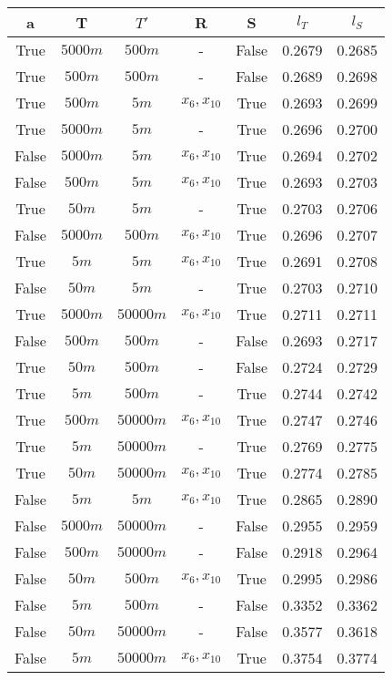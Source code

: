 \begin{tabular}{| c c c | c c | c c |}
\hline
a & T & $T'$ & R & S & $l_T$ & $l_S$ \\
\hline
True & $5000m$ & $500m$ & - & False & 0.2679 & 0.2685 \\
True & $500m$ & $500m$ & - & False & 0.2689 & 0.2698 \\
True & $500m$ & $5m$ & $x_{6}, x_{10}$ & True & 0.2693 & 0.2699 \\
True & $5000m$ & $5m$ & - & True & 0.2696 & 0.2700 \\
False & $5000m$ & $5m$ & $x_{6}, x_{10}$ & True & 0.2694 & 0.2702 \\
False & $500m$ & $5m$ & $x_{6}, x_{10}$ & True & 0.2693 & 0.2703 \\
True & $50m$ & $5m$ & - & True & 0.2703 & 0.2706 \\
False & $5000m$ & $500m$ & $x_{6}, x_{10}$ & True & 0.2696 & 0.2707 \\
True & $5m$ & $5m$ & $x_{6}, x_{10}$ & True & 0.2691 & 0.2708 \\
False & $50m$ & $5m$ & - & True & 0.2703 & 0.2710 \\
True & $5000m$ & $50000m$ & $x_{6}, x_{10}$ & True & 0.2711 & 0.2711 \\
False & $500m$ & $500m$ & - & False & 0.2693 & 0.2717 \\
True & $50m$ & $500m$ & - & False & 0.2724 & 0.2729 \\
True & $5m$ & $500m$ & - & True & 0.2744 & 0.2742 \\
True & $500m$ & $50000m$ & $x_{6}, x_{10}$ & True & 0.2747 & 0.2746 \\
True & $5m$ & $50000m$ & - & True & 0.2769 & 0.2775 \\
True & $50m$ & $50000m$ & $x_{6}, x_{10}$ & True & 0.2774 & 0.2785 \\
False & $5m$ & $5m$ & $x_{6}, x_{10}$ & True & 0.2865 & 0.2890 \\
False & $5000m$ & $50000m$ & - & False & 0.2955 & 0.2959 \\
False & $500m$ & $50000m$ & - & False & 0.2918 & 0.2964 \\
False & $50m$ & $500m$ & $x_{6}, x_{10}$ & True & 0.2995 & 0.2986 \\
False & $5m$ & $500m$ & - & False & 0.3352 & 0.3362 \\
False & $50m$ & $50000m$ & - & False & 0.3577 & 0.3618 \\
False & $5m$ & $50000m$ & $x_{6}, x_{10}$ & True & 0.3754 & 0.3774 \\
\hline
\end{tabular}
